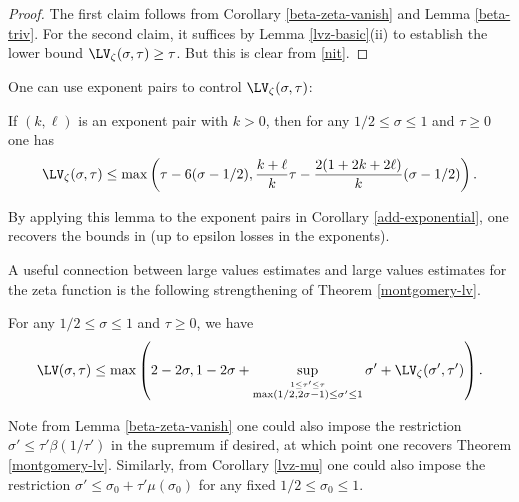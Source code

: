 \begin{proof}  The first claim follows from Corollary \ref{beta-zeta-vanish} and Lemma \ref{beta-triv}.  For the second claim, it suffices by Lemma \ref{lvz-basic}(ii) to establish the lower bound $\LV_\zeta(\sigma,\tau) \geq \tau$.  But this is clear from \eqref{nit}.
\end{proof}


One can use exponent pairs to control $\LV_\zeta(\sigma,\tau)$:

\begin{lemma}\label{zeta-from-exp}\cite[Theorem 8.2]{ivic} If $(k,\ell)$ is an exponent pair with $k>0$, then for any $1/2 \leq \sigma \leq 1$ and $\tau \geq 0$ one has
    $$ \LV_\zeta(\sigma,\tau) \leq \max\left( \tau - 6(\sigma-1/2), \frac{k+\ell}{k} \tau - \frac{2(1+2k+2\ell)}{k} (\sigma-1/2) \right).$$
\end{lemma}

By applying this lemma to the exponent pairs in Corollary \ref{add-exponential}, one recovers the bounds in \cite[Corollary 8.1, 8.2]{ivic} (up to epsilon losses in the exponents).

A useful connection between large values estimates and large values estimates for the zeta function is the following strengthening of Theorem \ref{montgomery-lv}.

\begin{lemma}\label{hl-improv}  For any $1/2 \leq \sigma \leq 1$ and $\tau \geq 0$, we have
    $$ \LV(\sigma,\tau) \leq \max\left(2-2\sigma, 1 - 2\sigma + \sup_{\stackrel{1 \leq \tau' \leq \tau}{\max(1/2,2\sigma-1) \leq \sigma' \leq 1}}  \sigma' + \LV_\zeta(\sigma',\tau') \right).$$
\end{lemma}

Note from Lemma \ref{beta-zeta-vanish} one could also impose the restriction $\sigma' \leq \tau' \beta(1/\tau')$ in the supremum if desired, at which point one recovers Theorem \ref{montgomery-lv}.  Similarly, from Corollary \ref{lvz-mu} one could also impose the restriction $\sigma' \leq \sigma_0 + \tau' \mu(\sigma_0)$ for any fixed $1/2 \leq \sigma_0 \leq 1$.

